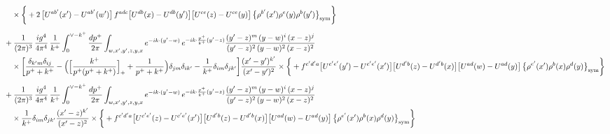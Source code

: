 \documentclass[10pt]{article}
\numberwithin{equation}{section}
\begin{document}
\begin{align}
&\quad\times\bigg\{+2\,\big[U^{ab^{\prime}}(x^{\prime})-U^{ab^{\prime}}(w^{\prime})\big]\,f^{adc}\big[U^{db}(x)-U^{db}(y^{\prime})\big]\big[U^{ce}(z)-U^{ce}(y)\big]\,\big\{\rho^{b^{\prime}}(x^{\prime})\rho^{e}(y)\rho^{b}(y^{\prime})\big\}_{\rm sym}\bigg\}\notag\\[6pt]
&+\frac{1}{(2\pi)^{3}}\,\frac{ig^{4}}{4\pi^{4}}\,\frac{1}{k^{+}}\int_{0}^{\vee-k^{+}}\frac{dp^{+}}{2\pi}\int_{w,x^{\prime},y^{\prime},z,y,x}e^{-ik\cdot(y^{\prime}-w)}\,e^{-ik\cdot\frac{p^{+}}{k^{+}}(y^{\prime}-z)}\frac{(y^{\prime}-z)^{m}\,(y-w)^{i}\,(x-z)^{j}}{(y^{\prime}-z)^{2}\,(y-w)^{2}\,(x-z)^{2}}\notag\\
&\quad\times\bigg[\frac{\delta_{k^{\prime}m}\delta_{ij}}{p^{+}+k^{+}}-\Big(\Big[\frac{k^{+}}{p^{+}(p^{+}+k^{+})}\Big]_{+}+\frac{1}{p^{+}+k^{+}}\Big)\delta_{jm}\delta_{ik^{\prime}}-\frac{1}{k^{+}}\delta_{im}\delta_{jk^{\prime}}\bigg]\frac{(x^{\prime}-y^{\prime})^{k^{\prime}}}{(x^{\prime}-y^{\prime})^{2}}\times\bigg\{+f^{c^{\prime}d^{\prime}a}\big[U^{c^{\prime}e^{\prime}}(y^{\prime})-U^{c^{\prime}e^{\prime}}(x^{\prime})\big]\big[U^{d^{\prime}b}(z)-U^{d^{\prime}b}(x)\big]\big[U^{ad}(w)-U^{ad}(y)\big]\,\big\{\rho^{e^{\prime}}(x^{\prime})\rho^{b}(x)\rho^{d}(y)\big\}_{\rm sym}\bigg\}\notag\\[6pt]
&+\frac{1}{(2\pi)^{3}}\,\frac{ig^{4}}{4\pi^{4}}\,\frac{1}{k^{+}}\int_{0}^{\vee-k^{+}}\frac{dp^{+}}{2\pi}\int_{w,x^{\prime},y^{\prime},z,y,x}e^{-ik\cdot(y^{\prime}-w)}\,e^{-ik\cdot\frac{p^{+}}{k^{+}}(y^{\prime}-z)}\frac{(y^{\prime}-z)^{m}\,(y-w)^{i}\,(x-z)^{j}}{(y^{\prime}-z)^{2}\,(y-w)^{2}\,(x-z)^{2}}\notag\\
&\quad\times\frac{1}{k^{+}}\delta_{im}\delta_{jk^{\prime}}\frac{(x^{\prime}-z)^{k^{\prime}}}{(x^{\prime}-z)^{2}}\times\bigg\{+f^{c^{\prime}d^{\prime}a}\big[U^{c^{\prime}e^{\prime}}(z)-U^{c^{\prime}e^{\prime}}(x^{\prime})\big]\big[U^{d^{\prime}b}(z)-U^{d^{\prime}b}(x)\big]\big[U^{ad}(w)-U^{ad}(y)\big]\,\big\{\rho^{e^{\prime}}(x^{\prime})\rho^{b}(x)\rho^{d}(y)\big\}_{\rm sym}\bigg\}
\end{align}
\end{document}
